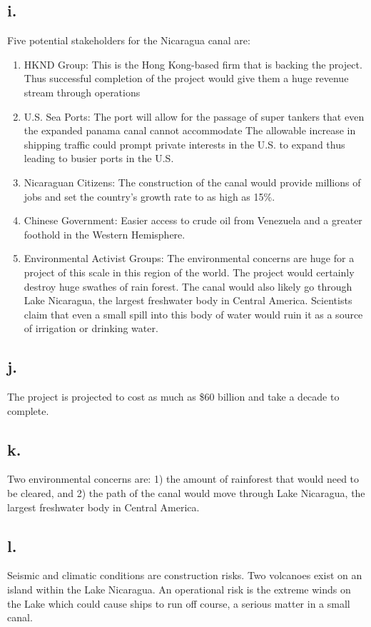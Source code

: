 \documentclass[12pt]{article}
\renewcommand{\=}[1]{\stackrel{#1}{=}} %
\theoremstyle{definition}
\theoremstyle{remark}
\begin{document}
\subsection{i.}
Five potential stakeholders for the Nicaragua canal are:
\begin{enumerate}
	\item HKND Group: This is the Hong Kong-based firm that is backing the project. Thus successful completion of the project would give them a huge revenue stream through operations
	\item U.S. Sea Ports: The port will allow for the passage of super tankers that even the expanded panama canal cannot accommodate The allowable increase in shipping traffic could prompt private interests in the U.S. to expand thus leading to busier ports in the U.S.
	\item Nicaraguan Citizens: The construction of the canal would provide millions of jobs and set the country's growth rate to as high as 15\%.
	\item Chinese Government: Easier access to crude oil from Venezuela and a greater foothold in the Western Hemisphere.
	\item Environmental Activist Groups: The environmental concerns are huge for a project of this scale in this region of the world. The project would certainly destroy huge swathes of rain forest. The canal would also likely go through Lake Nicaragua, the largest freshwater body in Central America. Scientists claim that even a small spill into this body of water would ruin it as a source of irrigation or drinking water.
\end{enumerate}

\subsection{j.}
The project is projected to cost as much as \$60 billion and take a decade to complete.

\subsection{k.}
Two environmental concerns are: 1) the amount of rainforest that would need to be cleared, and 2) the path of the canal would move through Lake Nicaragua, the largest freshwater body in Central America.

\subsection{l.}
Seismic and climatic conditions are construction risks. Two volcanoes exist on an island within the Lake Nicaragua. An operational risk is the extreme winds on the Lake which could cause ships to run off course, a serious matter in a small canal.
\end{document}
